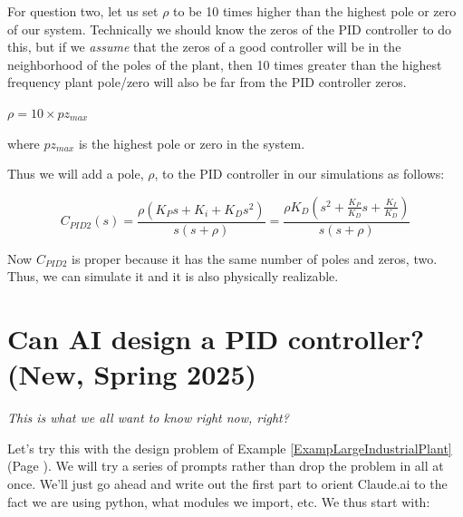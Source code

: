 
For question two, let us set $\rho$ to be 10 times higher than the highest pole or zero of our system.   Technically we should know the zeros of the PID controller to do this, but if we {\it assume} that the zeros of a good controller will be in the neighborhood of the poles of the plant, then 10 times greater than the highest frequency plant pole/zero will also be far from the PID controller zeros.	%

$\rho = 10\times pz_{max}$	%

where $pz_{max}$ is the highest pole or zero in the system.	%

Thus we will add a pole, $\rho$,  to the PID controller in our simulations as follows:	%

\[
C_{PID2}(s) = \frac{\rho(K_Ps+K_i + K_Ds^2)}{s(s+\rho)} = \frac{\rho K_D(s^2 + \frac{K_P}{K_D}s + \frac{K_I}{K_D})}{s(s+\rho)}
\]

Now $C_{PID2}$ is proper
because it has the same number of poles and zeros, two.  Thus, we can simulate it and it is also physically realizable.	%



\section{Can AI design a PID controller? (New, Spring 2025)}
\begin{center}
{\it This is what we all want to know right now, right? }
\end{center}
\vspace{0.2in}

Let's try this with the design problem of Example \ref{ExampLargeIndustrialPlant}
(Page \pageref{ExampLargeIndustrialPlant}).
We will try a series of prompts rather than drop the problem in all at once.
We'll
just go ahead and write out the first part to orient Claude.ai to the
fact we are using python, what modules we import, etc.  We thus start with:



